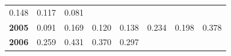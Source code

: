 \documentclass[]{article}
\begin{document}
\begin{longtable}[]{@{}rrrrrrrr@{}}
\begin{minipage}[t]{0.09\columnwidth}
0.148\strut
\end{minipage} & \begin{minipage}[t]{0.08\columnwidth}\raggedleft\strut
0.117\strut
\end{minipage} & \begin{minipage}[t]{0.10\columnwidth}\raggedleft\strut
0.081\strut
\end{minipage}\tabularnewline
\begin{minipage}[t]{0.08\columnwidth}\raggedleft\strut
\textbf{2005}\strut
\end{minipage} & \begin{minipage}[t]{0.10\columnwidth}\raggedleft\strut
0.091\strut
\end{minipage} & \begin{minipage}[t]{0.11\columnwidth}\raggedleft\strut
0.169\strut
\end{minipage} & \begin{minipage}[t]{0.08\columnwidth}\raggedleft\strut
0.120\strut
\end{minipage} & \begin{minipage}[t]{0.14\columnwidth}\raggedleft\strut
0.138\strut
\end{minipage} & \begin{minipage}[t]{0.09\columnwidth}\raggedleft\strut
0.234\strut
\end{minipage} & \begin{minipage}[t]{0.08\columnwidth}\raggedleft\strut
0.198\strut
\end{minipage} & \begin{minipage}[t]{0.10\columnwidth}\raggedleft\strut
0.378\strut
\end{minipage}\tabularnewline
\begin{minipage}[t]{0.08\columnwidth}\raggedleft\strut
\textbf{2006}\strut
\end{minipage} & \begin{minipage}[t]{0.10\columnwidth}\raggedleft\strut
0.259\strut
\end{minipage} & \begin{minipage}[t]{0.11\columnwidth}\raggedleft\strut
0.431\strut
\end{minipage} & \begin{minipage}[t]{0.08\columnwidth}\raggedleft\strut
0.370\strut
\end{minipage} & \begin{minipage}[t]{0.14\columnwidth}\raggedleft\strut
0.297\strut
\end{minipage} & \begin{minipage}[t]{0.09\columnwidth}\raggedleft\strut

\end{minipage}
\end{longtable}
\end{document}
